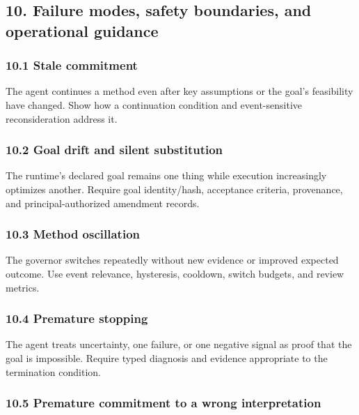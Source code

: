 \subsection{10. Failure modes, safety boundaries, and operational guidance}\label{failure-modes-safety-boundaries-and-operational-guidance}

\subsubsection{10.1 Stale commitment}\label{stale-commitment}

The agent continues a method even after key assumptions or the goal's feasibility have changed. Show how a continuation condition and event-sensitive reconsideration address it.

\subsubsection{10.2 Goal drift and silent substitution}\label{goal-drift-and-silent-substitution}

The runtime's declared goal remains one thing while execution increasingly optimizes another. Require goal identity/hash, acceptance criteria, provenance, and principal-authorized amendment records.

\subsubsection{10.3 Method oscillation}\label{method-oscillation}

The governor switches repeatedly without new evidence or improved expected outcome. Use event relevance, hysteresis, cooldown, switch budgets, and review metrics.

\subsubsection{10.4 Premature stopping}\label{premature-stopping}

The agent treats uncertainty, one failure, or one negative signal as proof that the goal is impossible. Require typed diagnosis and evidence appropriate to the termination condition.

\subsubsection{10.5 Premature commitment to a wrong interpretation}\label{premature-commitment-to-a-wrong-interpretation}

